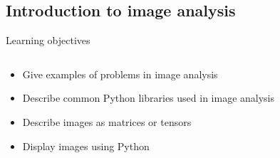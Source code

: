 \documentclass[9pt, aspectratio=169]{beamer}
\begin{document}
\begin{frame}
    \section {Introduction to image analysis}
\end{frame}

\begin{frame}
    {Learning objectives}
    \begin{columns}
        \begin{column}{0.8\textwidth}
            \begin{itemize}
                \item Give examples of problems in image analysis
                \item Describe common Python libraries used in image analysis
                \item Describe images as matrices or tensors
                \item Display images using Python
            \end{itemize}
        \end{column}
        \begin{column}{0.2\textwidth}

\end{column}
\end{columns}
\end{frame}
\end{document}
